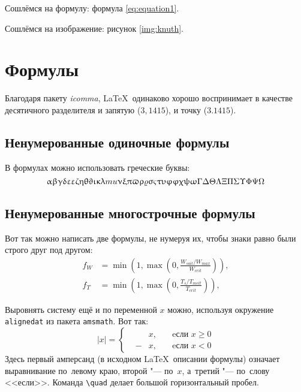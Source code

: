 Сошлёмся на формулу: формула \eqref{eq:equation1}.

Сошлёмся на изображение: рисунок \ref{img:knuth}.


\section{Формулы} \label{sect1_3}

Благодаря пакету \textit{icomma}, \LaTeX~одинаково хорошо воспринимает в качестве десятичного разделителя и запятую ($3,1415$), и точку ($3.1415$).

\subsection{Ненумерованные одиночные формулы} \label{subsect1_3_1}


В формулах можно использовать греческие буквы:
\[
\alpha\beta\gamma\delta\epsilon\varepsilon\zeta\eta\theta\vartheta\iota\kappa\lambda\\mu\nu\xi\pi\varpi\rho\varrho\sigma\varsigma\tau\upsilon\phi\varphi\chi\psi\omega\Gamma\Delta\Theta\Lambda\Xi\Pi\Sigma\Upsilon\Phi\Psi\Omega
\]


\subsection{Ненумерованные многострочные формулы} \label{subsect1_3_2}

Вот так можно написать две формулы, не нумеруя их, чтобы знаки равно были строго друг под другом:
\begin{align}
  f_W & =  \min \left( 1, \max \left( 0, \frac{W_{soil} / W_{max}}{W_{crit}} \right)  \right), \nonumber \\
  f_T & =  \min \left( 1, \max \left( 0, \frac{T_s / T_{melt}}{T_{crit}} \right)  \right), \nonumber
\end{align}

Выровнять систему ещё и по переменной $ x $ можно, используя окружение \verb|alignedat| из пакета \verb|amsmath|. Вот так: 
\[
    |x| = \left\{
    \begin{alignedat}{2}
        &&x, \quad &\text{eсли } x\geqslant 0 \\
        &-&x, \quad & \text{eсли } x<0
    \end{alignedat}
    \right.
\]
Здесь первый амперсанд (в исходном \LaTeX\ описании формулы) означает выравнивание по~левому краю, второй "--- по~$ x $, а~третий "--- по~слову <<если>>. Команда \verb|\quad| делает большой горизонтальный пробел.

